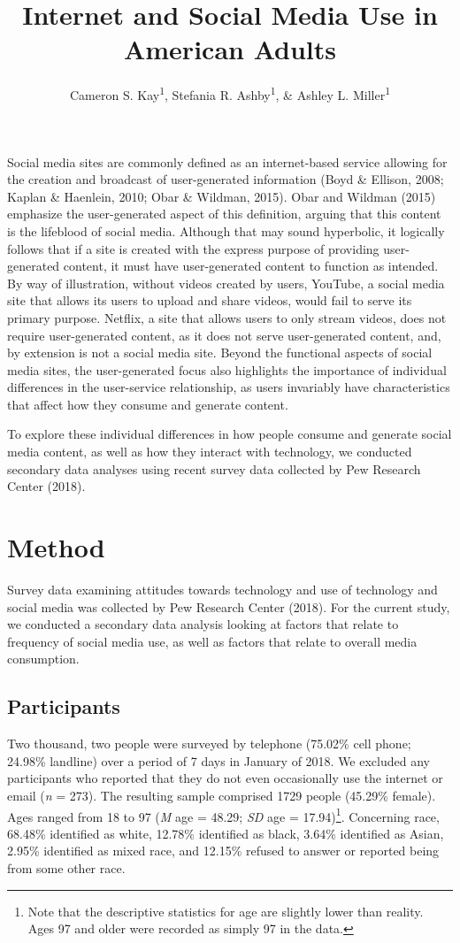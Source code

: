 \documentclass[man, fleqn, noextraspace]{apa6}
\title{Internet and Social Media Use in American Adults}
\author{Cameron S. Kay\textsuperscript{1}, Stefania R. Ashby\textsuperscript{1},
\& Ashley L. Miller\textsuperscript{1}}
\date{}
\affiliation{
\vspace{0.5cm}
\textsuperscript{1} University of Oregon}
\let\rmarkdownfootnote\footnote%
\def\footnote{\protect\rmarkdownfootnote}
\theoremstyle{definition}
\theoremstyle{definition}
\theoremstyle{definition}
\theoremstyle{remark}
\begin{document}
\maketitle

Social media sites are commonly defined as an internet-based service
allowing for the creation and broadcast of user-generated information
(Boyd \& Ellison, 2008; Kaplan \& Haenlein, 2010; Obar \& Wildman,
2015). Obar and Wildman (2015) emphasize the user-generated aspect of
this definition, arguing that this content is the lifeblood of social
media. Although that may sound hyperbolic, it logically follows that if
a site is created with the express purpose of providing user-generated
content, it must have user-generated content to function as intended. By
way of illustration, without videos created by users, YouTube, a social
media site that allows its users to upload and share videos, would fail
to serve its primary purpose. Netflix, a site that allows users to only
stream videos, does not require user-generated content, as it does not
serve user-generated content, and, by extension is not a social media
site. Beyond the functional aspects of social media sites, the
user-generated focus also highlights the importance of individual
differences in the user-service relationship, as users invariably have
characteristics that affect how they consume and generate content.

To explore these individual differences in how people consume and
generate social media content, as well as how they interact with
technology, we conducted secondary data analyses using recent survey
data collected by Pew Research Center (2018).

\section{Method}\label{method}

Survey data examining attitudes towards technology and use of technology
and social media was collected by Pew Research Center (2018). For the
current study, we conducted a secondary data analysis looking at factors
that relate to frequency of social media use, as well as factors that
relate to overall media consumption.

\subsection{Participants}\label{participants}

Two thousand, two people were surveyed by telephone (75.02\% cell phone;
24.98\% landline) over a period of 7 days in January of 2018. We
excluded any participants who reported that they do not even
occasionally use the internet or email (\emph{n} = 273). The resulting
sample comprised 1729 people (45.29\% female). Ages ranged from 18 to 97
(\emph{M} age = 48.29; \emph{SD} age =
17.94)\footnote{Note that the descriptive statistics for age are slightly lower than reality. Ages 97 and older were recorded as simply 97 in the data.}.
Concerning race, 68.48\% identified as white, 12.78\% identified as
black, 3.64\% identified as Asian, 2.95\% identified as mixed race, and
12.15\% refused to answer or reported being from some other race.
\end{document}
